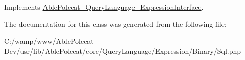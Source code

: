 Implements \hyperlink{interface_able_polecat___query_language___expression_interface_a7516ca30af0db3cdbf9a7739b48ce91d}{Able\+Polecat\+\_\+\+Query\+Language\+\_\+\+Expression\+Interface}.



The documentation for this class was generated from the following file\+:\begin{DoxyCompactItemize}
\item 
C\+:/wamp/www/\+Able\+Polecat-\/\+Dev/usr/lib/\+Able\+Polecat/core/\+Query\+Language/\+Expression/\+Binary/Sql.\+php\end{DoxyCompactItemize}
